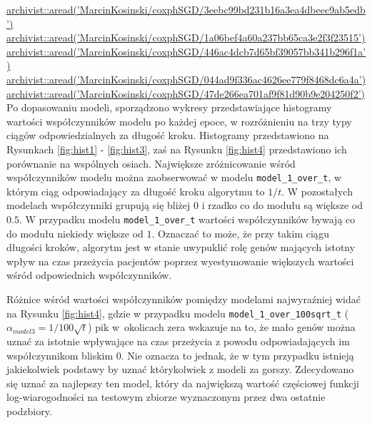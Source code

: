 \href{https://github.com/MarcinKosinski/coxphSGD/blob/master/gallery/3eebc99bd231b16a3ea4dbeec9ab5edb.rda?raw=true}{archivist::aread('MarcinKosinski/coxphSGD/3eebc99bd231b16a3ea4dbeec9ab5edb')} \\
\href{https://github.com/MarcinKosinski/coxphSGD/blob/master/gallery/1a06bef4a60a237bb65ca3e2f3f23515.rda?raw=true}{archivist::aread('MarcinKosinski/coxphSGD/1a06bef4a60a237bb65ca3e2f3f23515')} \\
\href{https://github.com/MarcinKosinski/coxphSGD/blob/master/gallery/446ac4dcb7d65bf39057bb341b296f1a.rda?raw=true}{archivist::aread('MarcinKosinski/coxphSGD/446ac4dcb7d65bf39057bb341b296f1a')} \\
\href{https://github.com/MarcinKosinski/coxphSGD/blob/master/gallery/044ad9f336ac4626ee779f8468dc6a4a.rda?raw=true}{archivist::aread('MarcinKosinski/coxphSGD/044ad9f336ac4626ee779f8468dc6a4a')} \\
\href{https://github.com/MarcinKosinski/coxphSGD/blob/master/gallery/47de266ea701af9f81d90b9e204250f2.rda?raw=true}{archivist::aread('MarcinKosinski/coxphSGD/47de266ea701af9f81d90b9e204250f2')} \\

Po dopasowaniu modeli, sporządzono wykresy przedstawiające histogramy wartości współczynników modelu po każdej epoce, w rozróżnieniu na trzy typy ciągów odpowiedzialnych za długość kroku. Histogramy przedstawiono na Rysunkach \ref{fig:hist1} - \ref{fig:hist3}, zaś na Rysunku \ref{fig:hist4} przedstawiono ich porównanie na wspólnych osiach. Największe zróżnicowanie wśród współczynników modelu można zaobserwować w modelu \texttt{model\_1\_over\_t}, w którym ciąg odpowiadający za długość kroku algorytmu to $1/t$. W pozostałych modelach współczynniki grupują się bliżej $0$ i rzadko co do modułu są większe od $0.5$. W przypadku modelu \texttt{model\_1\_over\_t} wartości współczynników bywają co do modułu niekiedy większe od $1$. Oznaczać to może, że przy takim ciągu długości kroków, algorytm jest w stanie uwypuklić rolę genów mających istotny wpływ na czas przeżycia pacjentów poprzez wyestymowanie większych wartości wśród odpowiednich współczynników. 

Różnice wśród wartości współczynników pomiędzy modelami najwyraźniej widać na Rysunku \ref{fig:hist4}, gdzie w przypadku modelu \texttt{model\_1\_over\_100sqrt\_t} ($\alpha_{model3} = 1/100\sqrt{t}$) pik w~okolicach zera wskazuje na to, że mało genów można uznać za istotnie wpływające na czas przeżycia z powodu odpowiadających im współczynnikom bliskim $0$. Nie oznacza to jednak, że w tym przypadku istnieją jakiekolwiek podstawy by uznać którykolwiek z modeli za gorszy. Zdecydowano się uznać za najlepszy ten model, który da największą wartość częściowej funkcji log-wiarogodności na testowym zbiorze wyznaczonym przez dwa ostatnie podzbiory.
